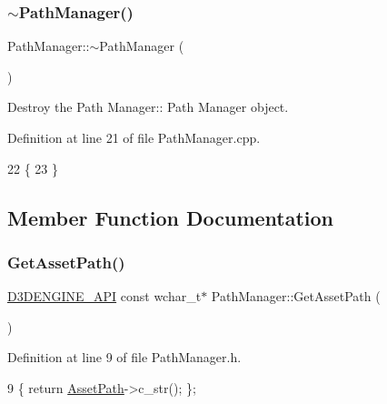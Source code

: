 \subsubsection{\texorpdfstring{$\sim$\+Path\+Manager()}{~PathManager()}}
{\footnotesize\ttfamily Path\+Manager\+::$\sim$\+Path\+Manager (\begin{DoxyParamCaption}{ }\end{DoxyParamCaption})}



Destroy the Path Manager\+:\+: Path Manager object. 



Definition at line 21 of file Path\+Manager.\+cpp.


\begin{DoxyCode}
22 \{
23 \}
\end{DoxyCode}


\subsection{Member Function Documentation}
\mbox{\label{class_path_manager_a959fe4866fb2388dd46eaf872a1a15ce}} 
\subsubsection{\texorpdfstring{Get\+Asset\+Path()}{GetAssetPath()}}
{\footnotesize\ttfamily \mbox{\hyperlink{stdafx_8h_a8ee2d990c5dfba7794dd2b60741d7722}{D3\+D\+E\+N\+G\+I\+N\+E\+\_\+\+A\+PI}} const wchar\+\_\+t$\ast$ Path\+Manager\+::\+Get\+Asset\+Path (\begin{DoxyParamCaption}{ }\end{DoxyParamCaption})\hspace{0.3cm}{\ttfamily [inline]}}



Definition at line 9 of file Path\+Manager.\+h.


\begin{DoxyCode}
9 \{ \textcolor{keywordflow}{return} \mbox{\hyperlink{class_path_manager_aa10cc8c03331c77828bf9e155644d018}{AssetPath}}->c\_str(); \};
\end{DoxyCode}
\mbox{\label{class_path_manager_aa66f8bb5f729328242e7386babc1ff22}} 
